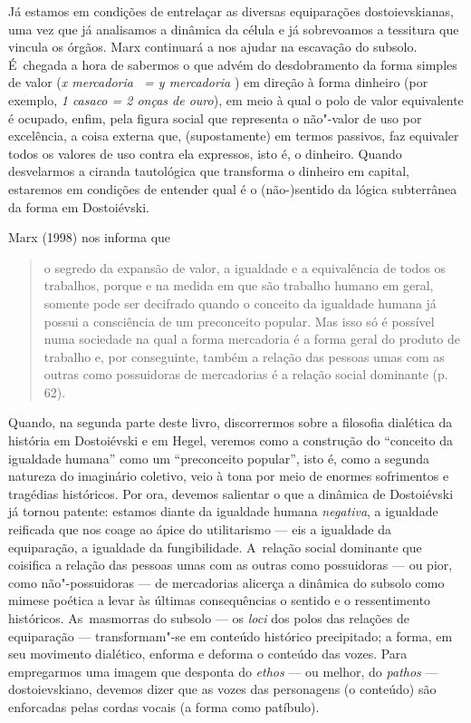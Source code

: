 Já estamos em condições de entrelaçar as diversas equiparações
dostoievskianas, uma vez que já analisamos a dinâmica da célula e já
sobrevoamos a tessitura que vincula os órgãos. Marx continuará a nos
ajudar na escavação do subsolo. É~chegada a hora de sabermos o que advém
do desdobramento da forma simples de valor (\emph{x mercadoria ~= y
mercadoria }) em direção à forma dinheiro (por exemplo, \emph{1 casaco
= 2 onças de ouro}), em meio à qual o polo de valor equivalente é
ocupado, enfim, pela figura social que representa o não"-valor de uso por
excelência, a coisa externa que, (supostamente) em termos passivos, faz
equivaler todos os valores de uso contra ela expressos, isto é, o
dinheiro. Quando desvelarmos a ciranda tautológica que transforma o
dinheiro em capital, estaremos em condições de entender qual é o
\mbox{(não-)sentido} da lógica subterrânea da forma em Dostoiévski.

Marx (1998) nos informa que

\begin{quote}
o segredo da expansão de valor, a igualdade e a equivalência de todos os
trabalhos, porque e na medida em que são trabalho humano em geral,
somente pode ser decifrado quando o conceito da igualdade humana já
possui a consciência de um preconceito popular. Mas isso só é possível
numa sociedade na qual a forma mercadoria é a forma geral do produto de
trabalho e, por conseguinte, também a relação das pessoas umas com as
outras como possuidoras de mercadorias é a relação social dominante (p.
62).
\end{quote}

Quando, na segunda parte deste livro, discorrermos sobre a filosofia
dialética da história em Dostoiévski e em Hegel, veremos como a
construção do ``conceito da igualdade humana'' como um ``preconceito
popular'', isto é, como a segunda natureza do imaginário coletivo, veio
à tona por meio de enormes sofrimentos e tragédias históricos. Por ora,
devemos salientar o que a dinâmica de Dostoiévski já tornou patente:
estamos diante da igualdade humana \emph{negativa}, a igualdade
reificada que nos coage ao ápice do utilitarismo --- eis a igualdade da
equiparação, a igualdade da fungibilidade. A~relação social dominante
que coisifica a relação das pessoas umas com as outras como possuidoras
--- ou pior, como não"-possuidoras --- de mercadorias alicerça a dinâmica
do subsolo como mimese poética a levar às últimas consequências o
sentido e o ressentimento históricos. As~masmorras do subsolo --- os
\emph{loci} dos polos das relações de equiparação --- transformam"-se em
conteúdo histórico precipitado; a forma, em seu movimento dialético,
enforma e deforma o conteúdo das vozes. Para empregarmos uma imagem que
desponta do \emph{ethos} --- ou melhor, do \emph{pathos} ---
dostoievskiano, devemos dizer que as vozes das personagens (o conteúdo)
são enforcadas pelas cordas vocais (a forma como patíbulo).

